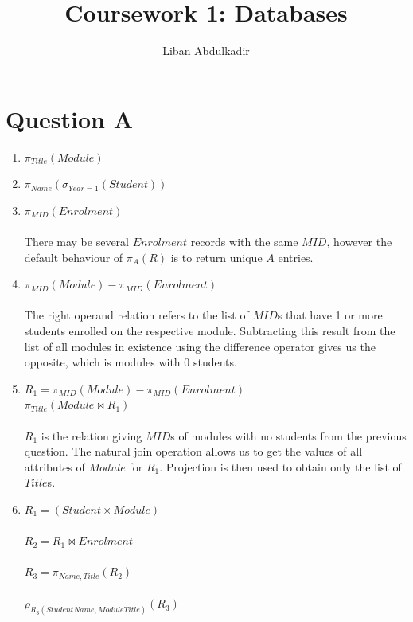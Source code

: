 \documentclass[a4paper]{article}
\begin{document}
\title{Coursework 1: Databases}
\author{Liban Abdulkadir}

\maketitle

\section*{Question A}
\begin{enumerate}
    \item $ \pi_{Title} (Module) $
    \item $ \pi_{Name} (\sigma_{Year = 1}(Student)) $
    \item $ \pi_{MID} (Enrolment) $ \\ \\
            There may be several $Enrolment$ records with the same $MID$,
            however the default behaviour of $\pi_{A} (R)$ is to return
            unique $A$ entries.
    \item $ \pi_{MID} (Module) - \pi_{MID} (Enrolment) $ \\ \\
            The right operand relation refers to the list of $MID$s that
            have 1 or more students enrolled on the respective module.
            Subtracting this result from the list of all modules in
            existence using the difference operator gives us the opposite,
            which is modules with 0 students.
    \item $ R_1 = \pi_{MID} (Module) - \pi_{MID} (Enrolment) $ \\
          $ \pi_{Title} (Module \Join R_1) $ \\ \\
            $R_1$ is the relation giving $MID$s of modules with no
            students from the previous question. The natural join
            operation allows us to get the values of all attributes of
            $Module$ for $R_1$. Projection is then used to obtain only
            the list of $Title$s.
    \item $ R_1 = (Student \times Module) $ \\ \\
          $ R_2 = R_1 \Join Enrolment $ \\ \\
          $ R_3 = \pi_{Name,Title} (R_2) $ \\ \\
          $ \rho_{R_3(StudentName,ModuleTitle)} (R_3) $ \\ \\

\end{enumerate}
\end{document}
